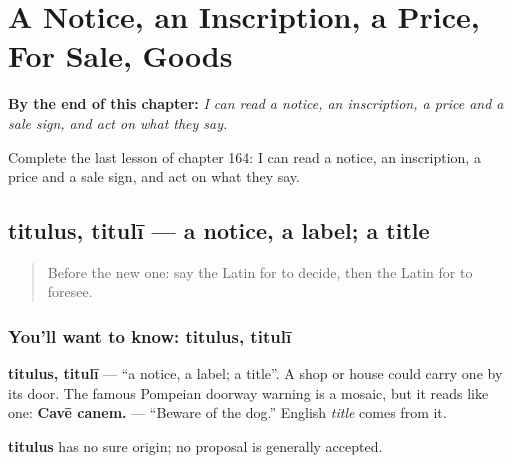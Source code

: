
\chapter{A Notice, an Inscription, a Price, For Sale, Goods}
\label{ch:la-a-notice-an-inscription-a-price-for-sale-goods}

\begin{chapteropening}
\textbf{By the end of this chapter:} \emph{I can read a notice, an inscription, a price and a sale sign, and act on what they say.}

Complete the last lesson of chapter 164: I can read a notice, an inscription, a price and a sale sign, and act on what they say.
\end{chapteropening}

\section[titulus, titulī]{titulus, titulī — a notice, a label; a title}

\label{lesson:LA-C164-titulus}



\begin{quote}
Before the new one: say the Latin for to decide, then the Latin for to foresee.
\end{quote}

\subsection*{You'll want to know: titulus, titulī}
\textbf{titulus, titulī} — \textquotedblleft{}a notice, a label; a title\textquotedblright{}. A shop or house could carry one by its door. The famous Pompeian doorway warning is a mosaic, but it reads like one: \textbf{Cavē canem.} — \textquotedblleft{}Beware of the dog.\textquotedblright{} English \emph{title} comes from it.

\begin{cousinweb}
\textbf{titulus} has no sure origin; no proposal is generally accepted.
\end{cousinweb}

